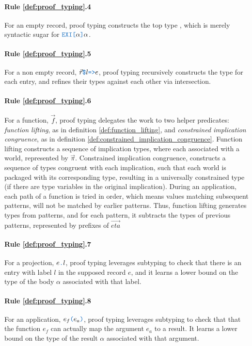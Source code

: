 \documentclass[acmsmall]{acmart}
\theoremstyle{definition}
\begin{document}
\paragraph{Rule \ref{def:proof_typing}.4}
For an empty record, proof typing constructs the top type ,
which is merely syntactic sugar for $\obj{EXI[}\alpha\obj{]}\alpha$.

\paragraph{Rule \ref{def:proof_typing}.5}
For a non empty record, $\vec{r}\obj{\$}l\obj{=>}e$, proof typing 
recursively constructs the type for each entry, and
refines their types against each other via intersection.

\paragraph{Rule \ref{def:proof_typing}.6}
For a function, $\vec{f}$, proof typing 
delegates the work to two helper predicates: \emph{function lifting}, as in definition \ref{def:function_lifting}, and
\emph{constrained implication congruence}, as in definition \ref{def:constrained_implication_congruence}.
Function lifting constructs a sequence of implication types, where each associated with a world, represented by $\vec{\pi}$.
Constrained implication congruence, constructs a sequence of types congruent with each implication,
such that each world is packaged with its corresponding type, resulting in a universally constrained type 
(if there are type variables in the original implication). 
During an application, each path of a function is tried in order, which means values matching subsequent
patterns, will not be matched by earlier patterns. Thus, function lifting generates types from patterns,
and for each pattern, it subtracts the types of previous patterns,
represented by prefixes of $\vec{eta}$

\paragraph{Rule \ref{def:proof_typing}.7}
For a projection, $e\obj{.}l$, proof typing
leverages subtyping to check that there is an entry with label $l$ 
in the supposed record $e$, and it learns a lower bound 
on the type of the body $\alpha$ associated with that label.


\paragraph{Rule \ref{def:proof_typing}.8}
For an application, $e_f\obj{(}e_a\obj{)}$, proof typing
leverages subtyping to check that that the function $e_f$ can actually
map the argument $e_a$ to a result. It learns a lower bound 
on the type of the result $\alpha$ associated with that argument.
\end{document}
